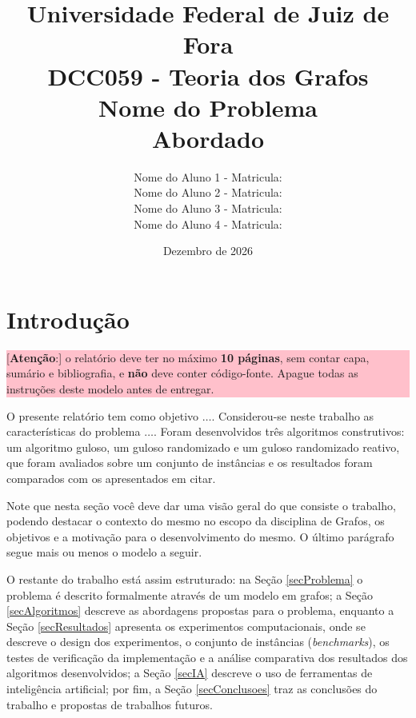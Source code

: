 \documentclass[12pt]{article}
\title{Universidade Federal de Juiz de Fora \\
        DCC059 - Teoria dos Grafos \\
        \vspace{6.0cm}
        {\Huge\textbf{Nome do Problema \\
                      Abordado}}\\
        \vspace{6.0cm}
}
\author{
    Nome do Aluno 1 - Matricula: \\
    Nome do Aluno 2 - Matricula: \\
    Nome do Aluno 3 - Matricula: \\
    Nome do Aluno 4 - Matricula: \\
}
\date{Dezembro de 2026}
\begin{document}
\maketitle
\newpage

\tableofcontents
\newpage

\section{Introdução}

\colorbox{pink}{
\begin{minipage}[c]{14cm}
[\textbf{Atenção}:] o relatório deve ter no máximo \textbf{10 páginas},
sem contar capa, sumário e bibliografia, e \textbf{não} deve conter
código-fonte. Apague todas as instruções deste modelo antes de entregar.
\end{minipage} }

O presente relatório tem como objetivo $\dots$. Considerou-se neste trabalho as características do problema  $\dots$. Foram desenvolvidos três algoritmos construtivos:  um algoritmo guloso, um guloso randomizado e um guloso randomizado reativo, que foram avaliados sobre um conjunto de instâncias e os resultados foram comparados com os apresentados em citar.

Note que nesta seção você deve dar uma visão geral do que consiste o trabalho, podendo destacar o contexto do mesmo no escopo da disciplina de Grafos, os objetivos e a motivação para o desenvolvimento do mesmo. O último parágrafo segue mais ou menos o modelo a seguir.

O restante do trabalho está assim estruturado: na Seção \ref{secProblema} o problema é descrito formalmente através de um modelo em grafos; a Seção \ref{secAlgoritmos} descreve as abordagens propostas para o problema, enquanto a Seção \ref{secResultados} apresenta os experimentos computacionais, onde se descreve o design dos experimentos, o conjunto de instâncias (\textit{benchmarks}), os testes de verificação da implementação e a análise comparativa dos resultados dos algoritmos desenvolvidos; a Seção \ref{secIA} descreve o uso de ferramentas de inteligência artificial; por fim, a Seção \ref{secConclusoes} traz as conclusões do trabalho e propostas de trabalhos futuros.



\end{document}
